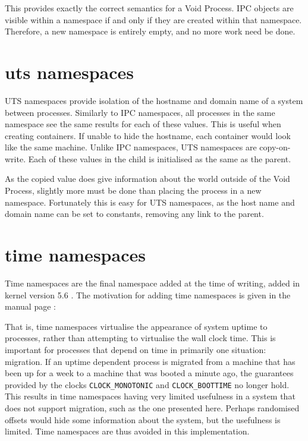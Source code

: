 \documentclass[a4paper,12pt,twoside,openright]{report}
\begin{document}

This provides exactly the correct semantics for a Void Process. IPC objects are visible within a namespace if and only if they are created within that namespace. Therefore, a new namespace is entirely empty, and no more work need be done.

\section{uts namespaces}
\label{sec:voiding-uts}

UTS namespaces provide isolation of the hostname and domain name of a system between processes. Similarly to IPC namespaces, all processes in the same namespace see the same results for each of these values. This is useful when creating containers. If unable to hide the hostname, each container would look like the same machine. Unlike IPC namespaces, UTS namespaces are copy-on-write. Each of these values in the child is initialised as the same as the parent.

As the copied value does give information about the world outside of the Void Process, slightly more must be done than placing the process in a new namespace. Fortunately this is easy for UTS namespaces, as the host name and domain name can be set to constants, removing any link to the parent.

\section{time namespaces}
\label{sec:voiding-time}

Time namespaces are the final namespace added at the time of writing, added in kernel version 5.6 \citep{noauthor_linux_2020}. The motivation for adding time namespaces is given in the manual page \citep{free_software_foundation_time_namespaces7_2021}:


That is, time namespaces virtualise the appearance of system uptime to processes, rather than attempting to virtualise the wall clock time. This is important for processes that depend on time in primarily one situation: migration. If an uptime dependent process is migrated from a machine that has been up for a week to a machine that was booted a minute ago, the guarantees provided by the clocks \texttt{CLOCK\_MONOTONIC} and \texttt{CLOCK\_BOOTTIME} no longer hold. This results in time namespaces having very limited usefulness in a system that does not support migration, such as the one presented here. Perhaps randomised offsets would hide some information about the system, but the usefulness is limited. Time namespaces are thus avoided in this implementation.
\end{document}

